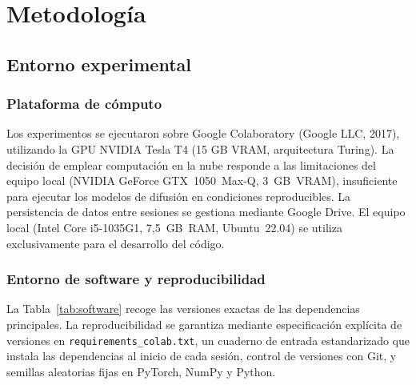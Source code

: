 \documentclass[12pt, a4paper, twoside]{book}
\begin{document}
\chapter{Metodología}
\label{ch:metodos}

\section{Entorno experimental}
\label{sec:entorno}

\subsection{Plataforma de cómputo}

Los experimentos se ejecutaron sobre Google Colaboratory (Google LLC, 2017), utilizando la GPU NVIDIA Tesla T4 (15 GB VRAM, arquitectura Turing). La decisión de emplear computación en la nube responde a las limitaciones del equipo local (NVIDIA GeForce GTX~1050~Max-Q, 3~GB~VRAM), insuficiente para ejecutar los modelos de difusión en condiciones reproducibles. La persistencia de datos entre sesiones se gestiona mediante Google Drive. El equipo local (Intel Core i5-1035G1, 7,5~GB~RAM, Ubuntu~22.04) se utiliza exclusivamente para el desarrollo del código.

\subsection{Entorno de software y reproducibilidad}

La Tabla~\ref{tab:software} recoge las versiones exactas de las dependencias principales. La reproducibilidad se garantiza mediante especificación explícita de versiones en \texttt{requirements\_colab.txt}, un cuaderno de entrada estandarizado que instala las dependencias al inicio de cada sesión, control de versiones con Git, y semillas aleatorias fijas en PyTorch, NumPy y Python.
\end{document}

